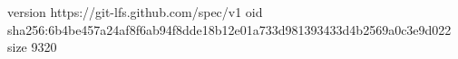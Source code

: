 version https://git-lfs.github.com/spec/v1
oid sha256:6b4be457a24af8f6ab94f8dde18b12e01a733d981393433d4b2569a0c3e9d022
size 9320
